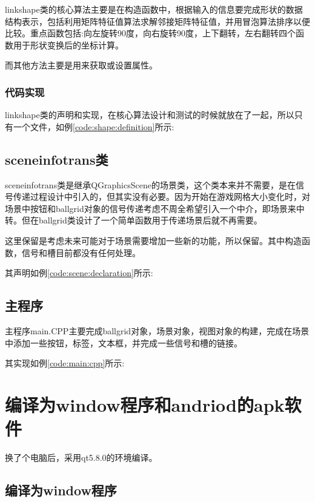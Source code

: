 \documentclass[11pt,twoside]{article} %
\begin{document}
linkshape类的核心算法主要是在构造函数中，根据输入的信息要完成形状的数据结构表示，包括利用矩阵特征值算法求解邻接矩阵特征值，并用冒泡算法排序以便比较。重点函数包括:向左旋转90度，向右旋转90度，上下翻转，左右翻转四个函数用于形状变换后的坐标计算。

而其他方法主要是用来获取或设置属性。

\subsubsection{代码实现}
linkshape类的声明和实现，在核心算法设计和测试的时候就放在了一起，所以只有一个文件，如例\ref{code:shape:definition}所示:

\subsection{sceneinfotrans类}
sceneinfotrans类是继承QGraphicsScene的场景类，这个类本来并不需要，是在信号传递过程设计中引入的，但其实没有必要。因为开始在游戏网格大小变化时，对场景中按钮和ballgrid对象的信号传递考虑不周全希望引入一个中介，即场景来中转。但在ballgrid类设计了一个简单函数用于传递场景后就不再需要。

这里保留是考虑未来可能对于场景需要增加一些新的功能，所以保留。其中构造函数，信号和槽目前都没有任何处理。

其声明如例\ref{code:scene:declaration}所示:

\subsection{主程序}
主程序main.CPP主要完成ballgrid对象，场景对象，视图对象的构建，完成在场景中添加一些按钮，标签，文本框，并完成一些信号和槽的链接。

其实现如例\ref{code:main:cpp}所示:


\section{编译为window程序和andriod的apk软件}

换了个电脑后，采用qt5.8.0的环境编译。

\subsection{编译为window程序}
\end{document}
